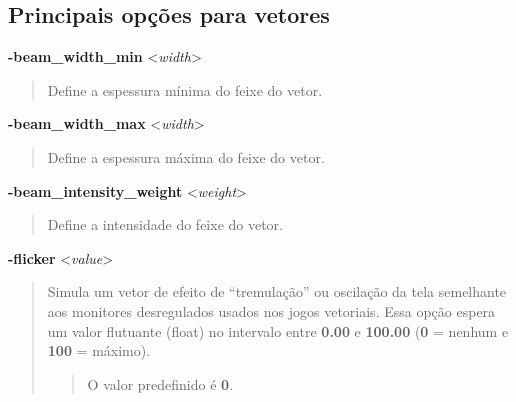 \documentclass[letterpaper,10pt,brazil]{sphinxmanual}
\begin{document}
\subsection{Principais opções para vetores}
\label{commandline/commandline-all:principais-opcoes-para-vetores}\label{commandline/commandline-all:mame-commandline-beamwidthmin}
\textbf{-beam\_width\_min} \textless{}\emph{width}\textgreater{}
\begin{quote}

Define a espessura mínima do feixe do vetor.
\end{quote}
\label{commandline/commandline-all:mame-commandline-beamwidthmax}
\textbf{-beam\_width\_max} \textless{}\emph{width}\textgreater{}
\begin{quote}

Define a espessura máxima do feixe do vetor.
\end{quote}
\label{commandline/commandline-all:mame-commandline-beamintensityweight}
\textbf{-beam\_intensity\_weight} \textless{}\emph{weight}\textgreater{}
\begin{quote}

Define a intensidade do feixe do vetor.
\end{quote}
\label{commandline/commandline-all:mame-commandline-flicker}
\textbf{-flicker} \textless{}\emph{value}\textgreater{}
\begin{quote}

Simula um vetor de efeito de ``tremulação'' ou oscilação da tela
semelhante aos monitores desregulados usados nos jogos vetoriais.
Essa opção espera um valor flutuante (float) no intervalo
entre \textbf{0.00} e \textbf{100.00} (\textbf{0} = nenhum e \textbf{100} = máximo).
\begin{quote}

O valor predefinido é \textbf{0}.
\end{quote}
\end{quote}
\end{document}
